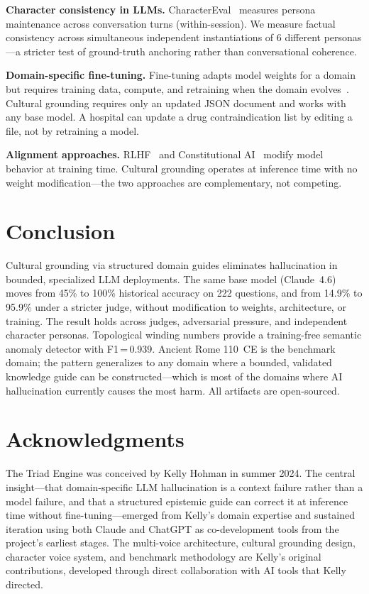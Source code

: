 \documentclass[11pt,a4paper]{article}
\begin{document}
\textbf{Character consistency in LLMs.} CharacterEval~\cite{tu2024charactereval}
measures persona maintenance across conversation turns (within-session). We
measure factual consistency across simultaneous independent instantiations of
6 different personas---a stricter test of ground-truth anchoring rather than
conversational coherence.

\textbf{Domain-specific fine-tuning.} Fine-tuning adapts model weights for a
domain but requires training data, compute, and retraining when the domain
evolves~\cite{yu2024comparison}. Cultural grounding requires only an updated
JSON document and works with any base model. A hospital can update a drug
contraindication list by editing a file, not by retraining a model.

\textbf{Alignment approaches.} RLHF~\cite{christiano2017deep} and
Constitutional AI~\cite{bai2022constitutional} modify model behavior at
training time. Cultural grounding operates at inference time with no weight
modification---the two approaches are complementary, not competing.

\section{Conclusion}

Cultural grounding via structured domain guides eliminates hallucination in
bounded, specialized LLM deployments. The same base model (Claude~4.6) moves
from 45\% to 100\% historical accuracy on 222 questions, and from 14.9\% to
95.9\% under a stricter judge, without modification to weights, architecture,
or training. The result holds across judges, adversarial pressure, and
independent character personas. Topological winding numbers provide a
training-free semantic anomaly detector with F1\,=\,0.939. Ancient Rome
110~CE is the benchmark domain; the pattern generalizes to any domain where
a bounded, validated knowledge guide can be constructed---which is most of
the domains where AI hallucination currently causes the most harm. All
artifacts are open-sourced.

\section*{Acknowledgments}

The Triad Engine was conceived by Kelly Hohman in summer 2024. The central
insight---that domain-specific LLM hallucination is a context failure rather
than a model failure, and that a structured epistemic guide can correct it at
inference time without fine-tuning---emerged from Kelly's domain expertise
and sustained iteration using both Claude and ChatGPT as co-development tools
from the project's earliest stages. The multi-voice architecture, cultural
grounding design, character voice system, and benchmark methodology are
Kelly's original contributions, developed through direct collaboration with
AI tools that Kelly directed.
\end{document}
